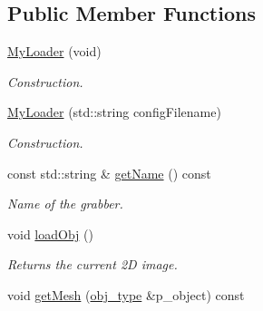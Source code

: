 \subsection*{Public Member Functions}
\begin{DoxyCompactItemize}
\item 
\hyperlink{classMyLoader_a40ebc4bfa57858e2cb1a7cdf8839a3da}{My\+Loader} (void)\hypertarget{classMyLoader_a40ebc4bfa57858e2cb1a7cdf8839a3da}{}\label{classMyLoader_a40ebc4bfa57858e2cb1a7cdf8839a3da}

\begin{DoxyCompactList}\small\item\em Construction. \end{DoxyCompactList}\item 
\hyperlink{classMyLoader_a9c6ce5cb2063955eace7a7fb8de0277b}{My\+Loader} (std\+::string config\+Filename)\hypertarget{classMyLoader_a9c6ce5cb2063955eace7a7fb8de0277b}{}\label{classMyLoader_a9c6ce5cb2063955eace7a7fb8de0277b}

\begin{DoxyCompactList}\small\item\em Construction. \end{DoxyCompactList}\item 
const std\+::string \& \hyperlink{classMyLoader_a10eb932a433ca5cd82258ba1c5da0291}{get\+Name} () const \hypertarget{classMyLoader_a10eb932a433ca5cd82258ba1c5da0291}{}\label{classMyLoader_a10eb932a433ca5cd82258ba1c5da0291}

\begin{DoxyCompactList}\small\item\em Name of the grabber. \end{DoxyCompactList}\item 
void \hyperlink{classMyLoader_a707d1e896cb08346acdfc43b42833422}{load\+Obj} ()\hypertarget{classMyLoader_a707d1e896cb08346acdfc43b42833422}{}\label{classMyLoader_a707d1e896cb08346acdfc43b42833422}

\begin{DoxyCompactList}\small\item\em Returns the current 2D image. \end{DoxyCompactList}\item 
void \hyperlink{classMyLoader_adfd8c3e638c7695ee086c5421670a747}{get\+Mesh} (\hyperlink{structputar_1_1obj__type}{obj\+\_\+type} \&p\+\_\+object) const \hypertarget{classMyLoader_adfd8c3e638c7695ee086c5421670a747}{}\label{classMyLoader_adfd8c3e638c7695ee086c5421670a747}


\end{DoxyCompactItemize}
